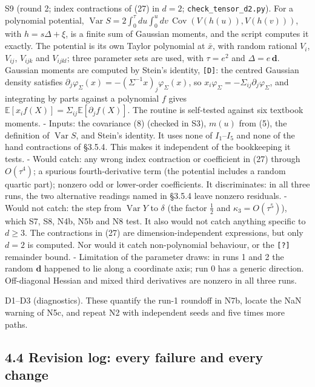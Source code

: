 \documentclass[11pt,a4paper]{article}
\begin{document}
S9 (round 2; index contractions of (27) in \(d=2\); \texttt{check\_tensor\_d2.py}). For a polynomial potential, \(\operatorname{Var}S=2\int_0^\tau du\int_0^u dv\,\operatorname{Cov}(V(h(u)),V(h(v)))\), with \(h=s\Delta+\xi\), is a finite sum of Gaussian moments, and the script computes it exactly. The potential is its own Taylor polynomial at \(\bar x\), with random rational \(V_i\), \(V_{ij}\), \(V_{ijk}\) and \(V_{ijkl}\); three parameter sets are used, with \(\tau=e^2\) and \(\Delta=e\,\mathbf d\). Gaussian moments are computed by Stein's identity, \texttt{[D]}: the centred Gaussian density satisfies \(\partial_j\varphi_\Sigma(x)=-(\Sigma^{-1}x)_j\varphi_\Sigma(x)\), so \(x_i\varphi_\Sigma=-\Sigma_{ij}\partial_j\varphi_\Sigma\), and integrating by parts against a polynomial \(f\) gives \(\mathbb E[x_if(X)]=\Sigma_{ij}\mathbb E[\partial_jf(X)]\). The routine is self-tested against six textbook moments.
- Inputs: the covariance (8) (checked in S3), \(m(u)\) from (5), the definition of \(\operatorname{Var}S\), and Stein's identity. It uses none of \(I_1\)--\(I_5\) and none of the hand contractions of §3.5.4. This makes it independent of the bookkeeping it tests.
- Would catch: any wrong index contraction or coefficient in (27) through \(O(\tau^4)\); a spurious fourth-derivative term (the potential includes a random quartic part); nonzero odd or lower-order coefficients. It discriminates: in all three runs, the two alternative readings named in §3.5.4 leave nonzero residuals.
- Would not catch: the step from \(\operatorname{Var}Y\) to \(\delta\) (the factor \(\tfrac12\) and \(\kappa_3=O(\tau^5)\)), which S7, S8, N4b, N5b and N8 test. It also would not catch anything specific to \(d\ge3\). The contractions in (27) are dimension-independent expressions, but only \(d=2\) is computed. Nor would it catch non-polynomial behaviour, or the \texttt{[?]} remainder bound.
- Limitation of the parameter draws: in runs 1 and 2 the random \(\mathbf d\) happened to lie along a coordinate axis; run 0 has a generic direction. Off-diagonal Hessian and mixed third derivatives are nonzero in all three runs.

D1--D3 (diagnostics). These quantify the run-1 roundoff in N7b, locate the NaN warning of N5c, and repeat N2 with independent seeds and five times more paths.

\hypertarget{revision-log-every-failure-and-every-change}{%
\subsection{4.4 Revision log: every failure and every change}\label{revision-log-every-failure-and-every-change}}
\end{document}
